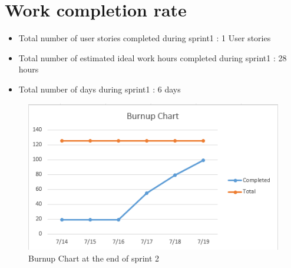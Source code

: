 \documentclass[10pt]{article}
\newcommand{\fancysecX}[2] {{\color{primary}\section*{#1} \label{sec:#2}}}
\begin{document}
\fancysecX{Work completion rate}{completeRate}

	\begin{itemize}
            \item Total number of user stories completed during sprint1 : 1 User stories
    \end{itemize}

    \begin{itemize}
            \item Total number of estimated ideal work hours completed during sprint1 : 28 hours
    \end{itemize}

    \begin{itemize}
            \item Total number of days during sprint1 : 6 days
    \end{itemize}


    \begin{figure}[!ht]
  	
  	\centering
    		\includegraphics[width=1\textwidth]{Burnupchart2}
    \caption{Burnup Chart at the end of sprint 2}
    \end{figure}

\vspace{5cm}
\end{document}
